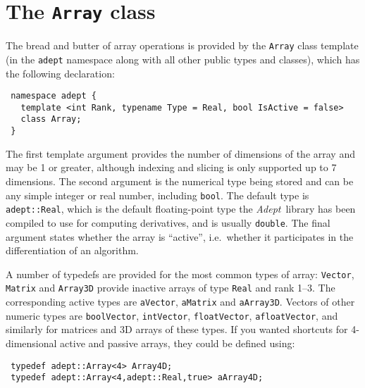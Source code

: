 \documentclass[a4,oneside]{book}
\def\codesize{\small}
\def\Adept{\emph{Adept}}
\def\code#1{{\codesize\texttt{#1}}}
\def\codestyle#1{\texttt{#1}}
\begin{document}
\section{The \codestyle{Array} class}
\label{sec:array}
The bread and butter of array operations is provided by the
\code{Array} class template (in the \code{adept} namespace along with
all other public types and classes), which has the following declaration:
\begin{lstlisting}
 namespace adept {
   template <int Rank, typename Type = Real, bool IsActive = false>
   class Array;
 }
\end{lstlisting}
The first template argument provides the number of dimensions of the
array and may be 1 or greater, although indexing and slicing is only
supported up to 7 dimensions. The second argument is the numerical
type being stored and can be any simple integer or real number,
including \code{bool}. The default type is \code{adept::Real}, which
is the default floating-point type the \Adept\ library has been
compiled to use for computing derivatives, and is usually
\code{double}. The final argument states whether the array is
``active'', i.e.\ whether it participates in the differentiation of an
algorithm.

A number of typedefs are provided for the most common types of array:
\code{Vector}, \code{Matrix} and \code{Array3D} provide inactive arrays
of type \code{Real} and rank 1--3. The corresponding active types are
\code{aVector}, \code{aMatrix} and \code{aArray3D}. Vectors of other
numeric types are \code{boolVector}, \code{intVector},
\code{floatVector}, \code{afloatVector}, and similarly for matrices
and 3D arrays of these types. If you wanted shortcuts for
4-dimensional active and passive arrays, they could be defined using:
\begin{lstlisting}
 typedef adept::Array<4> Array4D;
 typedef adept::Array<4,adept::Real,true> aArray4D;
\end{lstlisting}
\end{document}

